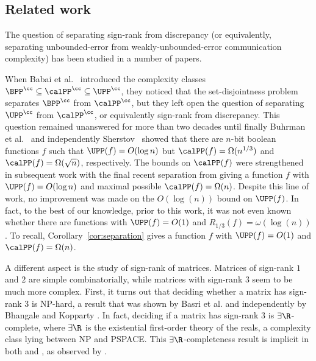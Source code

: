 %



%
%
%
%
%
%
%
%

%
%
%
%

%
%
%
%






\subsection{Related work}

The question of separating sign-rank from discrepancy (or equivalently, separating unbounded-error from weakly-unbounded-error communication complexity) has been studied in a number of papers.

When  Babai {et al.}~\cite{babai1986complexity} introduced the complexity classes $\BPP^\cc \subseteq \calPP^\cc \subseteq \UPP^\cc$, they noticed that the   set-disjointness problem separates  $\BPP^\cc$ from $\calPP^\cc$, but they left open the question of separating  $\UPP^\cc$ from $\calPP^\cc$, or equivalently sign-rank from discrepancy. This question  remained unanswered for more than two decades until finally  Buhrman {et al.}~\cite{buhrman2007computation} and independently Sherstov~\cite{sherstov2008halfspace} showed that there are  $n$-bit boolean %
functions  %
$f$ such that $\UPP(f) = O(\log n)$ but $\calPP(f) = \Omega(n^{1/3})$ and $\calPP(f)= \Omega(\sqrt{n})$, respectively. The bounds on $\calPP(f)$  were strengthened in subsequent %
work \cite{sherstov2011pattern,sherstov2013optimal,thaler2016lower,hardestSher}   %
with the final recent separation from \cite{hardestSher} giving a function $f$ with $\UPP(f) = O(\log n)$ and maximal possible $\calPP(f)= \Omega(n)$.  Despite this line of work,  no improvement was made on the $O(\log(n))$ bound on  $\UPP(f)$. In fact, to the best of our knowledge, prior to this work,  it was not even known whether there are functions with $\UPP(f)=O(1)$ and $R_{1/3}(f)=\omega(\log(n))$. To recall, Corollary~\ref{cor:separation} gives a function $f$ with $\UPP(f) = O(1)$ and $\calPP(f)= \Omega(n)$.

A different aspect is the study of sign-rank of matrices. Matrices of sign-rank $1$ and $2$ are simple combinatorially, while matrices with sign-rank $3$ seem to be much more complex. First, it turns out that deciding whether a matrix has sign-rank $3$ is NP-hard, a result that was shown by Basri {et al.} \cite{basri2009visibility} and independently by Bhangale and Kopparty \cite{bhangale2015complexity}. In fact, deciding if a matrix has sign-rank 3 is $\exists \R$-complete, where $\exists \R$ is the existential first-order theory of the reals, a complexity class lying  between NP and PSPACE. This $\exists \R$-completeness result is implicit in both \cite{basri2009visibility} and \cite{bhangale2015complexity}, as observed by \cite{alon2016sign}.



